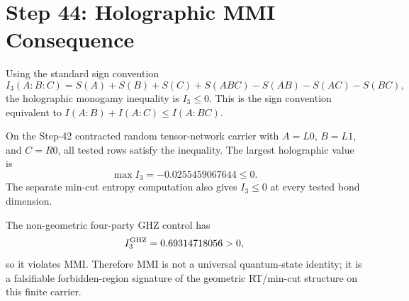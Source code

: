 \documentclass[11pt]{article}
\begin{document}
\section*{Step 44: Holographic MMI Consequence}

Using the standard sign convention
\[
I_3(A:B:C)=S(A)+S(B)+S(C)+S(ABC)-S(AB)-S(AC)-S(BC),
\]
the holographic monogamy inequality is \(I_3\le 0\). This is the sign
convention equivalent to \(I(A:B)+I(A:C)\le I(A:BC)\).

On the Step-42 contracted random tensor-network carrier with
\(A=L0\), \(B=L1\), and \(C=R0\), all tested rows satisfy the inequality.
The largest holographic value is
\[
\max I_3 = -0.0255459067644\le 0.
\]
The separate min-cut entropy computation also gives \(I_3\le 0\) at every
tested bond dimension.

The non-geometric four-party GHZ control has
\[
I_3^{\rm GHZ}=0.69314718056>0,
\]
so it violates MMI. Therefore MMI is not a universal quantum-state identity;
it is a falsifiable forbidden-region signature of the geometric RT/min-cut
structure on this finite carrier.
\end{document}
